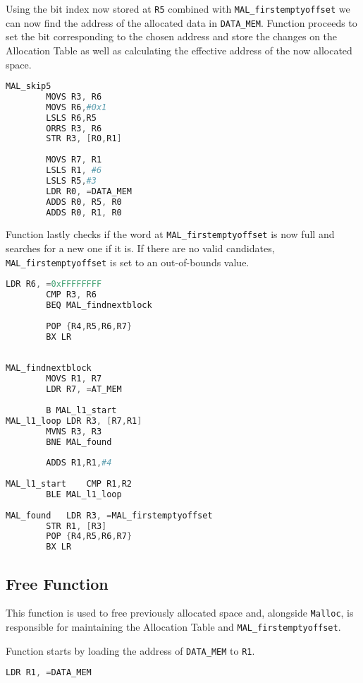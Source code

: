 \documentclass[pdftex,12pt,a4paper]{article}
\begin{document}
Using the bit index now stored at \verb|R5| combined with \verb|MAL_firstemptyoffset| we can now find the address of the allocated data in \verb|DATA_MEM|.
Function proceeds to set the bit corresponding to the chosen address and store the changes on the Allocation Table as well as calculating the effective address of the now allocated space. 

\begin{lstlisting}[language=Assembler]
MAL_skip5
		MOVS R3, R6
		MOVS R6,#0x1
		LSLS R6,R5
		ORRS R3, R6
		STR R3, [R0,R1]
		
		MOVS R7, R1
		LSLS R1, #6
		LSLS R5,#3
		LDR R0, =DATA_MEM
		ADDS R0, R5, R0	
		ADDS R0, R1, R0
\end{lstlisting}

Function lastly checks if the word at \verb|MAL_firstemptyoffset| is now full and searches for a new one if it is. If there are no valid candidates, \verb|MAL_firstemptyoffset| is set to an out-of-bounds value. 

\begin{lstlisting}[language=Assembler]
                LDR R6, =0xFFFFFFFF
		CMP R3, R6
		BEQ MAL_findnextblock
			
		POP {R4,R5,R6,R7}
		BX LR  
		
		
MAL_findnextblock
		MOVS R1, R7
		LDR R7, =AT_MEM
            
		B MAL_l1_start
MAL_l1_loop	LDR R3, [R7,R1]
		MVNS R3, R3
		BNE MAL_found
		
		ADDS R1,R1,#4
		
MAL_l1_start	CMP R1,R2
		BLE MAL_l1_loop
		
MAL_found	LDR R3, =MAL_firstemptyoffset
		STR R1, [R3]
		POP {R4,R5,R6,R7}
		BX LR
\end{lstlisting}

\subsection{Free Function}

This function is used to free previously allocated space and, alongside \verb|Malloc|, is responsible for maintaining the Allocation Table and \verb|MAL_firstemptyoffset|.

Function starts by loading the address of \verb|DATA_MEM| to \verb|R1|.

\begin{lstlisting}[language=Assembler]
    LDR R1, =DATA_MEM
\end{lstlisting}
\end{document}
